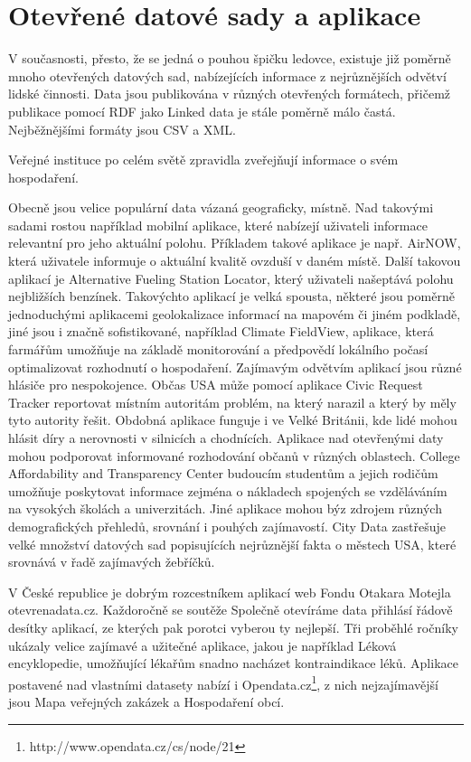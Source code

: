 \section{Otevřené datové sady a aplikace}

V současnosti, přesto, že se jedná o pouhou špičku ledovce, existuje již poměrně mnoho otevřených datových sad, nabízejících informace z nejrůznějších odvětví lidské činnosti. Data jsou publikována v různých otevřených formátech, přičemž publikace pomocí RDF jako Linked data je stále poměrně málo častá. Nejběžnějšími formáty jsou CSV a XML.

Veřejné instituce po celém světě zpravidla zveřejňují informace o svém hospodaření.

Obecně jsou velice populární data vázaná geograficky, místně. Nad takovými sadami rostou například mobilní aplikace, které nabízejí uživateli informace relevantní pro jeho aktuální polohu. Příkladem takové aplikace je např. AirNOW, která uživatele informuje o aktuální kvalitě ovzduší v daném místě. Další takovou aplikací je Alternative Fueling Station Locator, který uživateli našeptává polohu nejbližších benzínek. Takovýchto aplikací je velká spousta, některé jsou poměrně jednoduchými aplikacemi geolokalizace informací na mapovém či jiném podkladě, jiné jsou i značně sofistikované, například Climate FieldView, aplikace, která farmářům umožňuje na základě monitorování a předpovědí lokálního počasí optimalizovat rozhodnutí o hospodaření.
Zajímavým odvětvím aplikací jsou různé hlásiče pro nespokojence. Občas USA může pomocí aplikace Civic Request Tracker reportovat místním autoritám problém, na který narazil a který by měly tyto autority řešit. Obdobná aplikace funguje i ve Velké Británii, kde lidé mohou hlásit díry a nerovnosti v silnicích a chodnících.
Aplikace nad otevřenými daty mohou podporovat informované rozhodování občanů v různých oblastech. College Affordability and Transparency Center budoucím studentům a jejich rodičům umožňuje poskytovat informace zejména o nákladech spojených se vzděláváním na vysokých školách a univerzitách.
Jiné aplikace mohou býz zdrojem různých demografických přehledů, srovnání i pouhých zajímavostí. City Data zastřešuje velké množství datových sad popisujících nejrůznější fakta o městech USA, které srovnává v řadě zajímavých žebříčků.

V České republice je dobrým rozcestníkem aplikací web Fondu Otakara Motejla otevrenadata.cz. Každoročně se soutěže Společně otevíráme data přihlásí řádově desítky aplikací, ze kterých pak porotci vyberou ty nejlepší. Tři proběhlé ročníky ukázaly velice zajímavé a užitečné aplikace, jakou je například Léková encyklopedie, umožňující lékařům snadno nacházet kontraindikace léků. Aplikace postavené nad vlastními datasety nabízí i Opendata.cz\footnote{http://www.opendata.cz/cs/node/21}, z nich nejzajímavější jsou Mapa veřejných zakázek a Hospodaření obcí.

